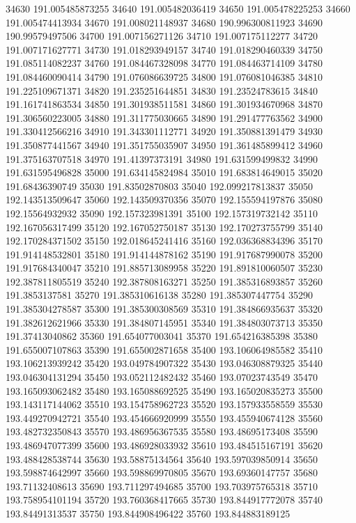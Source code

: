 {34630 191.005485873255
34640 191.005482036419
34650 191.005478225253
34660 191.005474413934
34670 191.008021148937
34680 190.996300811923
34690 190.99579497506
34700 191.007156271126
34710 191.007175112277
34720 191.007171627771
34730 191.018293949157
34740 191.018290460339
34750 191.085114082237
34760 191.084467328098
34770 191.084463714109
34780 191.084460090414
34790 191.076086639725
34800 191.076081046385
34810 191.225109671371
34820 191.235251644851
34830 191.23524783615
34840 191.161741863534
34850 191.301938511581
34860 191.301934670968
34870 191.306560223005
34880 191.311775030665
34890 191.291477763562
34900 191.330412566216
34910 191.343301112771
34920 191.350881391479
34930 191.350877441567
34940 191.351755035907
34950 191.361485899412
34960 191.375163707518
34970 191.41397373191
34980 191.631599499832
34990 191.631595496828
35000 191.634145824984
35010 191.683814649015
35020 191.68436390749
35030 191.83502870803
35040 192.099217813837
35050 192.143513509647
35060 192.143509370356
35070 192.155594197876
35080 192.15564932932
35090 192.157323981391
35100 192.157319732142
35110 192.167056317499
35120 192.167052750187
35130 192.170273755799
35140 192.170284371502
35150 192.018645241416
35160 192.036368834396
35170 191.914148532801
35180 191.914144878162
35190 191.917687990078
35200 191.917684340047
35210 191.885713089958
35220 191.891810060507
35230 192.387811805519
35240 192.387808163271
35250 191.385316893857
35260 191.3853137581
35270 191.385310616138
35280 191.385307447754
35290 191.385304278587
35300 191.385300308569
35310 191.384866935637
35320 191.382612621966
35330 191.384807145951
35340 191.384803073713
35350 191.37413040862
35360 191.654077003041
35370 191.654216385398
35380 191.655007107863
35390 191.655002871658
35400 193.106064985582
35410 193.106213939242
35420 193.049784907322
35430 193.046308879325
35440 193.046304131294
35450 193.052112482432
35460 193.07023743549
35470 193.165093062482
35480 193.165088692525
35490 193.165020835273
35500 193.143117144062
35510 193.154758962723
35520 193.157933558559
35530 193.449270942721
35540 193.454666920999
35550 193.455940674128
35560 193.482732350843
35570 193.486956367535
35580 193.48695173408
35590 193.486947077399
35600 193.486928033932
35610 193.484515167191
35620 193.488428538744
35630 193.58875134564
35640 193.597039850914
35650 193.598874642997
35660 193.598869970805
35670 193.69360147757
35680 193.71132408613
35690 193.711297494685
35700 193.703975765318
35710 193.758954101194
35720 193.760368417665
35730 193.844917772078
35740 193.84491313537
35750 193.844908496422
35760 193.844883189125
}
